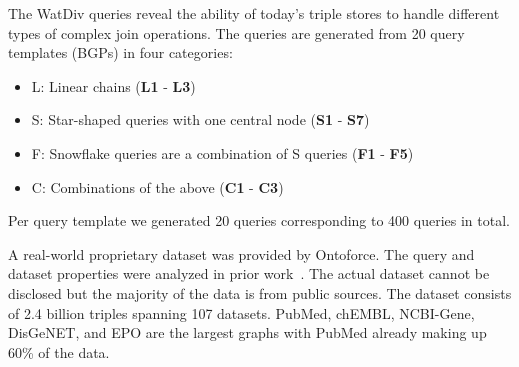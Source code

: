\documentclass[twocolumn]{bmcart}%
\newcommand\todo[1]{\textcolor{red}{#1}}
\begin{document}
The WatDiv queries reveal the ability of today's triple stores to handle different types of complex join operations.
The queries are generated from 20 query templates (BGPs) in four categories: 
\begin{itemize}
	\item L: Linear chains (\textbf{L1} - \textbf{L3})
	\item S: Star-shaped queries with one central node (\textbf{S1} - \textbf{S7})
	\item F: Snowflake queries are a combination of S queries (\textbf{F1} - \textbf{F5})
	\item C: Combinations of the above (\textbf{C1} - \textbf{C3})
\end{itemize}
Per query template we generated 20 queries corresponding to 400 queries in total. 

A real-world proprietary dataset was provided by Ontoforce. 
The query and dataset properties were analyzed in prior work~\cite{dewitte_swat4ls_2016}. The actual dataset cannot be disclosed but the majority of the data is from public sources. The dataset consists of 2.4 billion triples spanning 107 datasets. 
PubMed, chEMBL, NCBI-Gene, DisGeNET, and EPO are the largest graphs with PubMed already making up 60\% of the data. 

%
\end{document}
